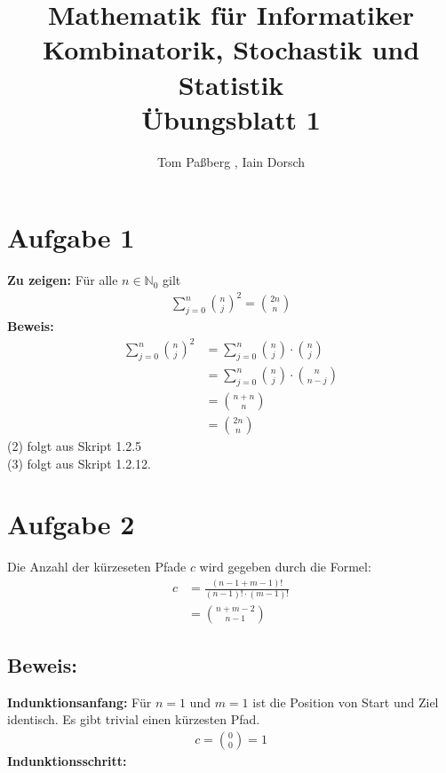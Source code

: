 \documentclass[a4paper]{scrartcl}
\title{Mathematik für Informatiker \\ Kombinatorik, Stochastik und Statistik \\ Übungsblatt 1}
\author{Tom Paßberg , Iain Dorsch}
\date{}
\begin{document}
\maketitle

\newpage
\section*{Aufgabe 1}
\textbf{Zu zeigen:} Für alle $n \in \mathbb{N}_0$ gilt
\begin{align*}
    \sum_{j=0}^{n} \binom{n}{j}^2 = \binom{2n}{n}
\end{align*}
\textbf{Beweis:}
\begin{align}
    \sum_{j=0}^{n} \binom{n}{j}^2 &= \sum_{j=0}^{n} \binom{n}{j} \cdot \binom{n}{j} \\
    &= \sum_{j=0}^{n} \binom{n}{j} \cdot \binom{n}{n - j} \\
    &= \binom{n + n}{n} \\
    &= \binom{2n}{n}
\end{align}
(2) folgt aus Skript 1.2.5 \\
(3) folgt aus Skript 1.2.12.\\

\section*{Aufgabe 2}
Die Anzahl der kürzeseten Pfade $c$ wird gegeben durch die Formel:
\begin{align*}
    c &= \frac{(n - 1 + m  - 1)!}{(n-1)! \cdot (m-1)!} \\[12px]
    &= \binom{n + m - 2}{n - 1}
\end{align*}

\subsection*{Beweis:}
\textbf{Indunktionsanfang:}
Für $n = 1$ und $m = 1$ ist die Position von Start und Ziel identisch. 
Es gibt trivial einen kürzesten Pfad. \\
\begin{align*}
    c = \binom{0}{0} = 1
\end{align*}
\textbf{Indunktionsschritt:}
\end{document}
